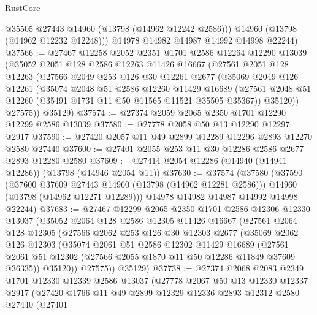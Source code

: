 \begin{lexlean}{RustCore}
\begin{coremodule}
          @35505
          @27443
          @14960
          (@13798 (@14962 @12242 @2586)))
        @14960
        (@13798 (@14962 @12232 @12248)))
      @14978
      @14982
      @14987
      @14992
      @14998
      @22244)
@37566 := @27467
    @12258
    @2052
    @2351
    @1701
    @2586
    @12264
    @12290
    @13039
    (@35052
      @2051
      @128
      @2586
      @12263
      @11426
      @16667
      (@27561
        @2051
        @128
        @12263
        (@27566
          @2049
          @253
          @126
          @30
          @12261
          @2677
          (@35069
            @2049
            @126
            @12261
            (@35074
              @2048
              @51
              @2586
              @12260
              @11429
              @16689
              (@27561 @2048 @51 @12260 (@35491 @1731 @11 @50 @11565 @11521 @35505 @35367))
              @35120))
          @27575))
      @35129)
@37574 := @27374 @2059 @2065 @2350 @1701 @12290 @12299 @2586 @13039
@37580 := @27778 @2058 @50 @13 @12290 @12297 @2917
@37590 := @27420 @2057 @11 @49 @2899 @12289 @12296 @2893 @12270 @2580 @27440
@37600 := @27401 @2055 @253 @11 @30 @12286 @2586 @2677 @2893 @12280 @2580
@37609 := @27414 @2054 @12286 (@14940 (@14941 @12286)) (@13798 (@14946 @2054 @11))
@37630 := @37574
    (@37580
      (@37590
        (@37600 @37609 @27443 @14960 (@13798 (@14962 @12281 @2586)))
        @14960
        (@13798 (@14962 @12271 @12289)))
      @14978
      @14982
      @14987
      @14992
      @14998
      @22244)
@37683 := @27467
    @12299
    @2065
    @2350
    @1701
    @2586
    @12306
    @12330
    @13037
    (@35052
      @2064
      @128
      @2586
      @12305
      @11426
      @16667
      (@27561
        @2064
        @128
        @12305
        (@27566
          @2062
          @253
          @126
          @30
          @12303
          @2677
          (@35069
            @2062
            @126
            @12303
            (@35074
              @2061
              @51
              @2586
              @12302
              @11429
              @16689
              (@27561 @2061 @51 @12302 (@27566 @2055 @1870 @11 @50 @12286 @11849 @37609 @36335))
              @35120))
          @27575))
      @35129)
@37738 := @27374
    @2068
    @2083
    @2349
    @1701
    @12330
    @12339
    @2586
    @13037
    (@27778
      @2067
      @50
      @13
      @12330
      @12337
      @2917
      (@27420
        @1766
        @11
        @49
        @2899
        @12329
        @12336
        @2893
        @12312
        @2580
        @27440
        (@27401

\end{coremodule}
\end{lexlean}
